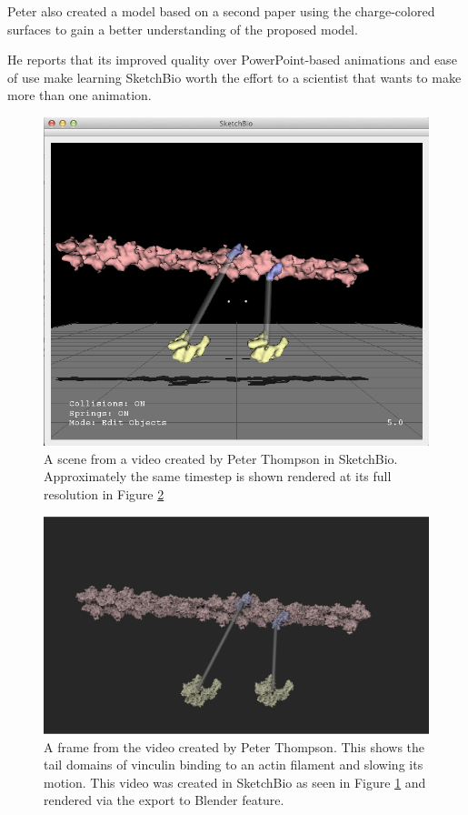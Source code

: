 \documentclass[twocolumn]{bmcart}%
\begin{document}
Peter also created a model based on a second paper using the charge-colored surfaces to gain a better understanding of the proposed model.

He reports that its improved quality over PowerPoint-based animations and ease of use make learning SketchBio worth the effort to a scientist that wants to make more than one animation.

\begin{figure}[h]
\centering
\includegraphics[width=0.9\columnwidth]{peter_model.png}
\caption{A scene from a video created by Peter Thompson in SketchBio.  Approximately the same timestep is shown rendered at its full resolution in Figure \ref{fig:peter_video}}
\label{fig:peter_model}
\end{figure}

\begin{figure}[h!]
\centering
\includegraphics[width=0.9\columnwidth]{peter_video.png}
\caption{A frame from the video created by Peter Thompson.  This shows the tail domains of vinculin binding to an actin filament and slowing its motion.  This video was created in SketchBio as seen in Figure \ref{fig:peter_model} and rendered via the export to Blender feature.}
\label{fig:peter_video}
\end{figure}
\end{document}
